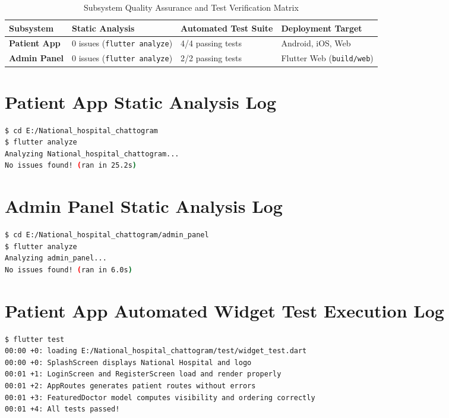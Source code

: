 \documentclass[11pt,a4paper,oneside]{report}
\begin{document}
\begin{table}[H]
\centering
\begin{tabularx}{\textwidth}{l p{3.2cm} p{3.5cm} X}
\toprule
\textbf{Subsystem} & \textbf{Static Analysis} & \textbf{Automated Test Suite} & \textbf{Deployment Target} \\
\midrule
\textbf{Patient App} & 0 issues (\texttt{flutter analyze}) & 4/4 passing tests & Android, iOS, Web \\
\textbf{Admin Panel} & 0 issues (\texttt{flutter analyze}) & 2/2 passing tests & Flutter Web (\texttt{build/web}) \\
\bottomrule
\end{tabularx}
\caption{Subsystem Quality Assurance and Test Verification Matrix}
\label{tab:test_summary}
\end{table}

\section{Patient App Static Analysis Log}
\begin{lstlisting}[language=bash,caption={Output of flutter analyze for Patient App}]
$ cd E:/National_hospital_chattogram
$ flutter analyze
Analyzing National_hospital_chattogram...
No issues found! (ran in 25.2s)
\end{lstlisting}

\section{Admin Panel Static Analysis Log}
\begin{lstlisting}[language=bash,caption={Output of flutter analyze for Admin Panel}]
$ cd E:/National_hospital_chattogram/admin_panel
$ flutter analyze
Analyzing admin_panel...
No issues found! (ran in 6.0s)
\end{lstlisting}

\section{Patient App Automated Widget Test Execution Log}
\begin{lstlisting}[language=bash,caption={Output of flutter test for Patient App}]
$ flutter test
00:00 +0: loading E:/National_hospital_chattogram/test/widget_test.dart
00:00 +0: SplashScreen displays National Hospital and logo
00:01 +1: LoginScreen and RegisterScreen load and render properly
00:01 +2: AppRoutes generates patient routes without errors
00:01 +3: FeaturedDoctor model computes visibility and ordering correctly
00:01 +4: All tests passed!
\end{lstlisting}
\end{document}
